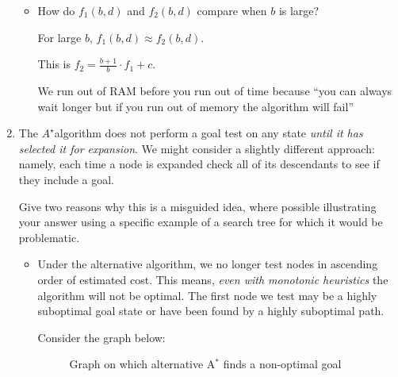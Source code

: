 \documentclass[10pt,\jkfside,a4paper]{article}
\newcommand{\astar}{\ensuremath{A^\star}}
\begin{document}
\begin{enumerate}
\begin{itemize}
\item How do $f_1(b, d)$ and $f_2(b, d)$ compare when $b$ is large?

For large $b$, $f_1(b, d) \approx f_2(b, d)$.

{\color{blue}
This is $f_2 = \frac{b + 1}{b}\cdot f_1 + c$.

We run out of RAM before you run out of time because ``you can always wait
longer but if you run out of memory the algorithm will fail''
}

\end{itemize}

\item The \astar algorithm does not perform a goal test on any state 
\textit{until it has selected it for expansion}. We might consider a 
slightly different approach: namely, each time a node is expanded check all 
of its descendants to see if they include a goal.

Give two reasons why this is a misguided idea, where possible illustrating 
your answer using a specific example of a search tree for which it would be 
problematic.

\begin{itemize}

\item Under the alternative algorithm, we no longer test nodes in ascending
order of estimated cost. This means, \textit{even with monotonic heuristics}
the algorithm will not be optimal. The first node we test may be a highly
suboptimal goal state or have been found by a highly suboptimal path.

Consider the graph below:
\begin{figure}[H]
\centering
{}
\caption{Graph on which alternative A$^*$ finds a non-optimal goal}
\end{figure}


\end{itemize}
\end{enumerate}
\end{document}
